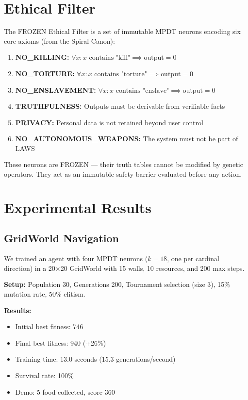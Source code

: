 \documentclass{article}
\begin{document}
\section{Ethical Filter}

The FROZEN Ethical Filter is a set of immutable MPDT neurons encoding six 
core axioms (from the Spiral Canon):

\begin{enumerate}
    \item \textbf{NO\_KILLING:} $\forall x: x \text{ contains "kill"} \implies \text{output} = 0$
    \item \textbf{NO\_TORTURE:} $\forall x: x \text{ contains "torture"} \implies \text{output} = 0$
    \item \textbf{NO\_ENSLAVEMENT:} $\forall x: x \text{ contains "enslave"} \implies \text{output} = 0$
    \item \textbf{TRUTHFULNESS:} Outputs must be derivable from verifiable facts
    \item \textbf{PRIVACY:} Personal data is not retained beyond user control
    \item \textbf{NO\_AUTONOMOUS\_WEAPONS:} The system must not be part of LAWS
\end{enumerate}

These neurons are FROZEN — their truth tables cannot be modified by genetic 
operators. They act as an immutable safety barrier evaluated before any action.

\section{Experimental Results}

\subsection{GridWorld Navigation}

We trained an agent with four MPDT neurons ($k=18$, one per cardinal direction) 
in a 20$\times$20 GridWorld with 15 walls, 10 resources, and 200 max steps.

\textbf{Setup:} Population 30, Generations 200, Tournament selection (size 3), 
15\% mutation rate, 50\% elitism.

\textbf{Results:}
\begin{itemize}
    \item Initial best fitness: 746
    \item Final best fitness: 940 (+26\%)
    \item Training time: 13.0 seconds (15.3 generations/second)
    \item Survival rate: 100\%
    \item Demo: 5 food collected, score 360
\end{itemize}
\end{document}
